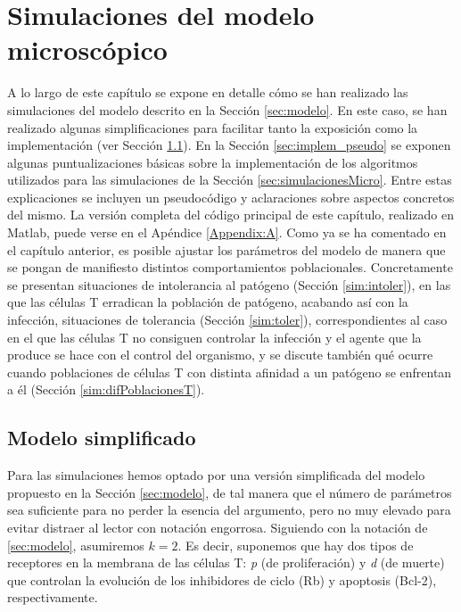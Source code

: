 
\chapter{Simulaciones del modelo microscópico}
\label{cap:simulaciones}

A lo largo de este capítulo se expone en detalle cómo se han realizado las simulaciones del modelo descrito en la Sección \ref{sec:modelo}. En este caso, se han realizado algunas simplificaciones para facilitar tanto la exposición como la implementación (ver Sección \ref{sec:modelo_simplif}). En la Sección \ref{sec:implem_pseudo} se exponen algunas puntualizaciones básicas sobre la implementación de los algoritmos utilizados para las simulaciones de la Sección \ref{sec:simulacionesMicro}. Entre estas explicaciones se incluyen un pseudocódigo y aclaraciones sobre aspectos concretos del mismo. La versión completa del código principal de este capítulo, realizado en Matlab, puede verse en el Apéndice \ref{Appendix:A}. Como ya se ha comentado en el capítulo anterior, es posible ajustar los parámetros del modelo de manera que se pongan de manifiesto distintos comportamientos poblacionales. Concretamente se presentan situaciones de intolerancia al patógeno (Sección \ref{sim:intoler}), en las que las células T erradican la población de patógeno, acabando así con la infección, situaciones de tolerancia (Sección \ref{sim:toler}), correspondientes al caso en el que las células T no consiguen controlar la infección y el agente que la produce se hace con el control del organismo, y se discute también qué ocurre cuando poblaciones de células T con distinta afinidad a un patógeno se enfrentan a él (Sección \ref{sim:difPoblacionesT}).


\section{Modelo simplificado}
\label{sec:modelo_simplif}

Para las simulaciones hemos optado por una versión simplificada del modelo propuesto en la Sección \ref{sec:modelo}, de tal manera que el número de parámetros sea suficiente para no perder la esencia del argumento, pero no muy elevado para evitar distraer al lector con notación engorrosa. Siguiendo con la notación de \ref{sec:modelo}, asumiremos $k=2$. Es decir, suponemos que hay dos tipos de receptores en la membrana de las células T: \textit{p} (de proliferación) y \textit{d} (de muerte) que controlan la evolución de los inhibidores de ciclo (Rb) y apoptosis (Bcl-2), respectivamente.

